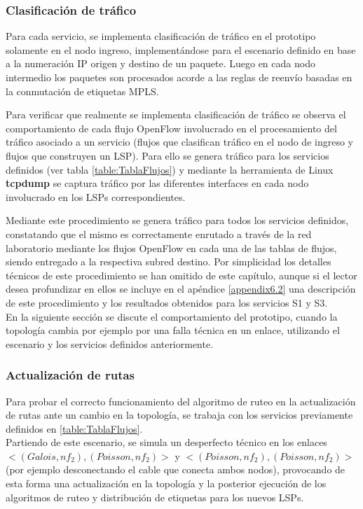 \subsubsection{Clasificaci\'on de tr\'afico}
Para cada servicio, se implementa clasificaci\'on de tr\'afico en el prototipo solamente en el nodo ingreso, implementándose para el escenario definido en base a la numeraci\'on IP origen y destino de un paquete. Luego en cada nodo intermedio los paquetes son procesados acorde a las reglas de reenvío basadas en la conmutación de etiquetas MPLS.

Para verificar que realmente se implementa clasificaci\'on de tr\'afico se observa el comportamiento de cada flujo OpenFlow involucrado en el procesamiento del tr\'afico asociado a un servicio (flujos que clasifican tr\'afico en el nodo de ingreso y flujos que construyen un LSP). Para ello se genera tr\'afico para los servicios definidos (ver tabla \ref{table:TablaFlujos}) y mediante la herramienta de Linux \textbf{tcpdump} se captura tr\'afico por las diferentes interfaces en cada nodo involucrado en los LSPs correspondientes. 

Mediante este procedimiento se genera tr\'afico para todos los servicios definidos, constatando que el mismo es correctamente enrutado a trav\'es de la red laboratorio mediante los flujos OpenFlow en cada una de las tablas de flujos, siendo entregado a la respectiva subred destino. Por simplicidad los detalles t\'ecnicos de este procedimiento se han omitido de este cap\'itulo, aunque si el lector desea profundizar en ellos se incluye en el ap\'endice \ref{appendix6.2} una descripci\'on de este procedimiento y los resultados obtenidos para los servicios S1 y S3.\\

En la siguiente secci\'on se discute el comportamiento del prototipo, cuando la topolog\'ia cambia por ejemplo por una falla t\'ecnica en un enlace, utilizando el escenario y los servicios definidos anteriormente.

\subsubsection{Actualizaci\'on de rutas}
Para probar el correcto funcionamiento del algoritmo de ruteo en la actualizaci\'on de rutas ante un cambio en la topolog\'ia, se trabaja con los servicios previamente definidos en \ref{table:TablaFlujos}.\\ 

Partiendo de este escenario, se simula un desperfecto t\'ecnico en los enlaces \\ $<(Galois, nf_2), (Poisson, nf_2)>$ y  $<(Poisson, nf_2), (Poisson, nf_2)>$ (por ejemplo desconectando el cable que conecta ambos nodos), provocando de esta forma una actualizaci\'on en la topolog\'ia y la posterior ejecuci\'on de los algoritmos de ruteo y distribución de etiquetas para los nuevos LSPs.\\ 
 
